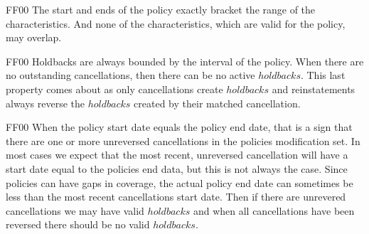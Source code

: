 %
\@pvspace{8.0pt}%
\begin{lcom}{7.5}%
\begin{cpar}{0}{F}{F}{0}{0}{}%
 The start and ends of the policy exactly bracket the range of the
 characteristics.
 And none of the characteristics, which are valid for the policy, may overlap.
\end{cpar}%
\end{lcom}%
%
%
\@pvspace{8.0pt}%
\begin{lcom}{7.5}%
\begin{cpar}{0}{F}{F}{0}{0}{}%
Holdbacks are always bounded by the interval of the policy. When there are no
 outstanding cancellations, then there can be no active
 \ensuremath{holdbacks}. This last property
 comes about as only cancellations create \ensuremath{holdbacks} and
 reinstatements always reverse
 the \ensuremath{holdbacks} created by their matched cancellation.
\end{cpar}%
\end{lcom}%
%
%
%
\@pvspace{8.0pt}%
\begin{lcom}{7.5}%
\begin{cpar}{0}{F}{F}{0}{0}{}%
 When the policy start date equals the policy end date, that is a sign that
 there are
 one or more unreversed cancellations in the policies modification set. In
 most cases
 we expect that the most recent, unreversed cancellation will have a start
 date equal
 to the policies end data, but this is not always the case. Since policies
 can have
 gaps in coverage, the actual policy end date can sometimes be less than the
 most
 recent cancellations start date. Then if there are unrevered cancellations
 we may have
 valid \ensuremath{holdbacks} and when all cancellations have been reversed
 there should be no
 valid \ensuremath{holdbacks}.
\end{cpar}%
\end{lcom}%

